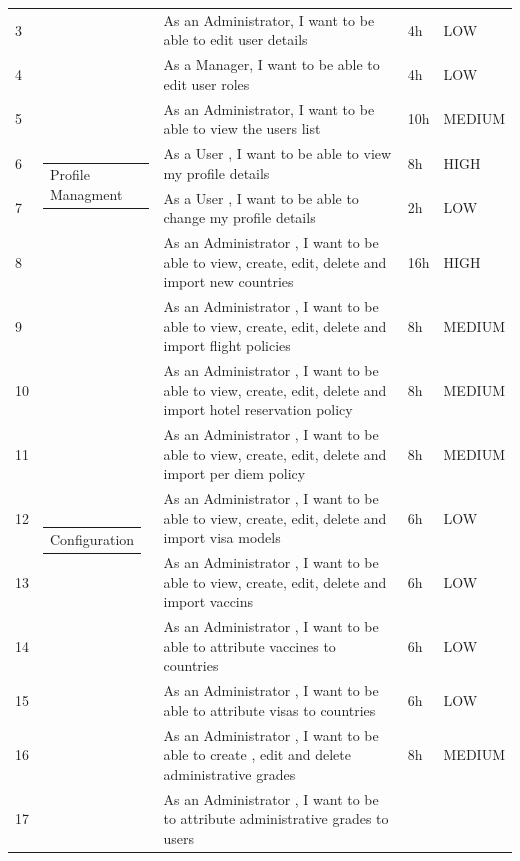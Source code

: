 \begin{center}
\begin{longtable}{|p{0.5cm}|p{3.5cm}|p{}|p{2cm}|p{2cm}|}
3
&
&As an Administrator, I want to be able to edit user details
&4h
&LOW\\
\cline{1-1} \cline{3-5} 
4
&
&As a Manager, I want to be able to edit user roles
&4h
&LOW\\
\cline{1-1} \cline{3-5} 
5
&
&As an Administrator, I want to be able to view the users list
&10h
&MEDIUM\\
\hline
6
&\multirow{2}{*}{\begin{tabular}[c]{@{}l@{}}Profile Managment\end{tabular}}
&As a User , I want to be able to view my profile details
&8h
&HIGH\\
\cline{1-1} \cline{3-5} 
7
&
&As a User , I want to be able to change my profile details
&2h
&LOW\\
\hline
8
&\multirow{11}{*}{\begin{tabular}[c]{@{}l@{}}Configuration\end{tabular}}
&As an Administrator , I want to be able to view, create, edit, delete and import new countries
&16h
&HIGH\\
\cline{1-1} \cline{3-5} 
9
&
&As an Administrator , I want to be able to view, create, edit, delete and import flight policies
&8h
&MEDIUM\\
\cline{1-1} \cline{3-5} 
10
&
&As an Administrator , I want to be able to view, create, edit, delete and import hotel reservation policy
&8h
&MEDIUM\\
\cline{1-1} \cline{3-5} 
11
&
&As an Administrator , I want to be able to view, create, edit, delete and import per diem policy
&8h
&MEDIUM\\
\cline{1-1} \cline{3-5} 
12
&
&As an Administrator , I want to be able to view, create, edit, delete and import visa models
&6h
&LOW\\
\cline{1-1} \cline{3-5} 
13
&
&As an Administrator , I want to be able to view, create, edit, delete and import vaccins
&6h
&LOW\\
\cline{1-1} \cline{3-5} 
14
&
&As an Administrator , I want to be able to attribute vaccines to countries
&6h
&LOW\\
\cline{1-1} \cline{3-5} 
15
&
&As an Administrator , I want to be able to attribute visas to countries
&6h
&LOW\\
\cline{1-1} \cline{3-5} 
16
&
&As an Administrator , I want to be able to create , edit and delete administrative grades
&8h
&MEDIUM\\
\cline{1-1} \cline{3-5} 
17
&
&As an Administrator , I want to be to attribute administrative grades to users

\end{longtable}
\end{center}

